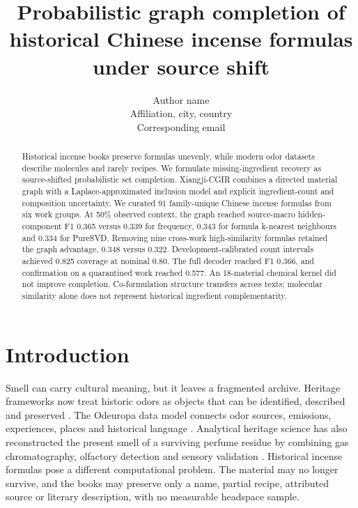 \documentclass[11pt]{article}
\title{Probabilistic graph completion of historical Chinese incense formulas under source shift}
\author{Author name\\Affiliation, city, country\\Corresponding email}
\date{}
\begin{document}
\maketitle

\begin{abstract}

Historical incense books preserve formulas unevenly, while modern odor datasets describe molecules and rarely recipes. We formulate missing-ingredient recovery as source-shifted probabilistic set completion. Xiangji-CGIR combines a directed material graph with a Laplace-approximated inclusion model and explicit ingredient-count and composition uncertainty. We curated 91 family-unique Chinese incense formulas from six work groups. At 50\% observed context, the graph reached source-macro hidden-component F1 0.365 versus 0.339 for frequency, 0.343 for formula k-nearest neighbours and 0.334 for PureSVD. Removing nine cross-work high-similarity formulas retained the graph advantage, 0.348 versus 0.322. Development-calibrated count intervals achieved 0.825 coverage at nominal 0.80. The full decoder reached F1 0.366, and confirmation on a quarantined work reached 0.577. An 18-material chemical kernel did not improve completion. Co-formulation structure transfers across texts; molecular similarity alone does not represent historical ingredient complementarity.

\end{abstract}

\section{Introduction}

Smell can carry cultural meaning, but it leaves a fragmented archive. Heritage frameworks now treat historic odors as objects that can be identified, described and preserved \cite{ref1}. The Odeuropa data model connects odor sources, emissions, experiences, places and historical language \cite{ref2}. Analytical heritage science has also reconstructed the present smell of a surviving perfume residue by combining gas chromatography, olfactory detection and sensory validation \cite{ref3}. Historical incense formulas pose a different computational problem. The material may no longer survive, and the books may preserve only a name, partial recipe, attributed source or literary description, with no measurable headspace sample.
\end{document}

